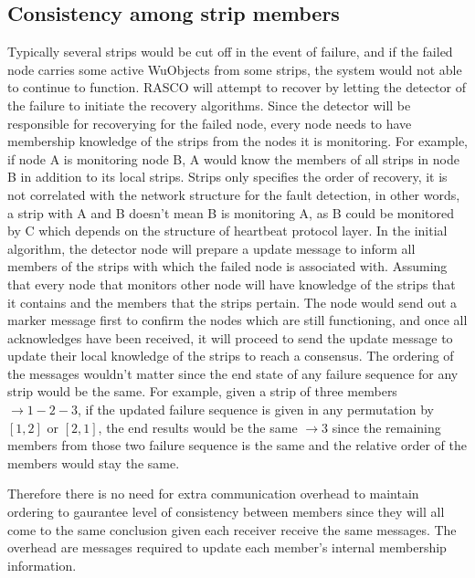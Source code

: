 \subsection{Consistency among strip members}

Typically several strips would be cut off in the event of failure, and if the
failed node carries some active WuObjects from some strips, the system would
not able to continue to function. RASCO will attempt to recover by letting the
detector of the failure to initiate the recovery algorithms.
Since the detector will be responsible for recoverying for the failed node,
every node needs to have membership knowledge of the strips from the nodes it
is monitoring. For example, if node A is monitoring node B, A would know the
members of all strips in node B in addition to its local strips. Strips only
specifies the order of recovery, it is not correlated with the network
structure for the fault detection, in other words, a strip with A and B doesn't
mean B is monitoring A, as B could be monitored by C which depends on the
structure of heartbeat protocol layer.
In the initial algorithm, the detector node will prepare a update message to
inform all members of the strips with which the failed node is associated with.
Assuming that every node that monitors other node will have knowledge of the
strips that it contains and the members that the strips pertain. The node would
send out a marker message first to confirm the nodes which are still
functioning, and once all acknowledges have been received, it will proceed to
send the update message to update their local knowledge of the strips to reach
a consensus. The ordering of the messages wouldn't matter since the end state
of any failure sequence for any strip would be the same. For example, given
a strip of three members $\rightarrow 1-2-3$, if the updated failure sequence
is given in any permutation by $[1, 2]$ or $[2, 1]$, the end results would be
the same $\rightarrow 3$ since the remaining members from those two failure
sequence is the same and the relative order of the members would stay the same.

Therefore there is no need for extra communication overhead to maintain
ordering to gaurantee level of consistency between members since they will all
come to the same conclusion given each receiver receive the same messages. The
overhead are messages required to update each member's internal membership
information.


